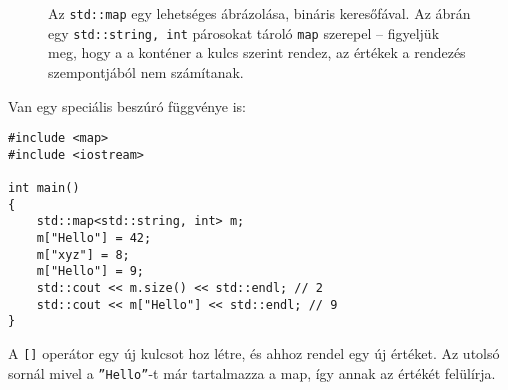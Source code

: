 \documentclass[../cpp_book/cpp_book.tex]{subfiles}
\begin{document}
	\begin{figure}[t]
		\centering
		\smallskip
		
		Az \texttt{std::map} egy lehetséges ábrázolása, bináris keresőfával. Az ábrán egy \texttt{std::string, int} párosokat tároló \texttt{map} szerepel -- figyeljük meg, hogy a a konténer a kulcs szerint rendez, az értékek a rendezés szempontjából nem számítanak.
	\end{figure}
	Van egy speciális beszúró függvénye is:
\begin{lstlisting}
#include <map>
#include <iostream>

int main()
{
	std::map<std::string, int> m;
	m["Hello"] = 42;
	m["xyz"] = 8;
	m["Hello"] = 9;
	std::cout << m.size() << std::endl; // 2
	std::cout << m["Hello"] << std::endl; // 9
}
\end{lstlisting}
	A \texttt{[]} operátor egy új kulcsot hoz létre, és ahhoz rendel egy új értéket. Az utolsó sornál mivel a \texttt{''Hello''}-t már tartalmazza a map, így annak az értékét felülírja.
	
\end{document}
